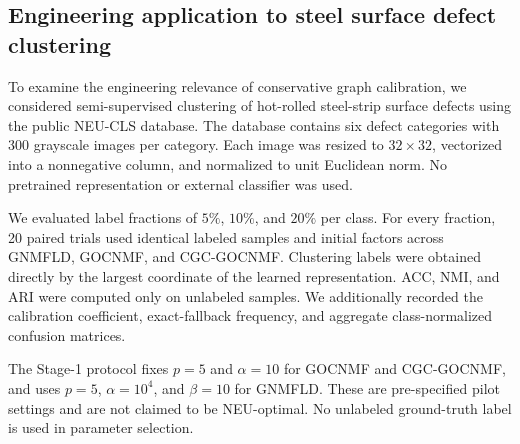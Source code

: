 \subsection{Engineering application to steel surface defect clustering}
\label{subsec:neu_application}

To examine the engineering relevance of conservative graph calibration, we
considered semi-supervised clustering of hot-rolled steel-strip surface
defects using the public NEU-CLS database. The database contains six defect
categories with 300 grayscale images per category. Each image was resized to
$32\times32$, vectorized into a nonnegative column, and normalized to unit
Euclidean norm. No pretrained representation or external classifier was
used.

We evaluated label fractions of $5\%$, $10\%$, and $20\%$ per class. For
every fraction, 20 paired trials used identical labeled samples and initial
factors across GNMFLD, GOCNMF, and CGC-GOCNMF. Clustering labels were
obtained directly by the largest coordinate of the learned representation.
ACC, NMI, and ARI were computed only on unlabeled samples. We additionally
recorded the calibration coefficient, exact-fallback frequency, and aggregate
class-normalized confusion matrices.

The Stage-1 protocol fixes $p=5$ and $\alpha=10$ for GOCNMF and
CGC-GOCNMF, and uses $p=5$, $\alpha=10^{4}$, and $\beta=10$ for GNMFLD.
These are pre-specified pilot settings and are not claimed to be NEU-optimal.
No unlabeled ground-truth label is used in parameter selection.

